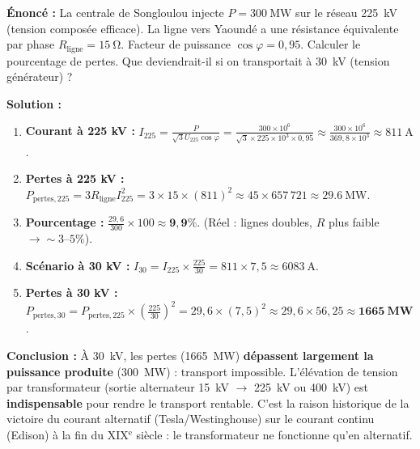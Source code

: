 \documentclass[11pt]{article}
\begin{document}
\begin{exoresolu}
\textbf{Énoncé :} La centrale de Songloulou injecte $P = \SI{300}{\mega\watt}$ sur le réseau \SI{225}{\kilo\volt} (tension composée efficace). La ligne vers Yaoundé a une résistance équivalente par phase $R_{\text{ligne}} = \SI{15}{\ohm}$. Facteur de puissance $\cos\varphi = 0,95$. Calculer le pourcentage de pertes. Que deviendrait-il si on transportait à \SI{30}{\kilo\volt} (tension générateur) ?

\tcblower

\textbf{Solution :}
\begin{enumerate}
    \item \textbf{Courant à 225 kV :} $I_{225} = \frac{P}{\sqrt{3} U_{225} \cos\varphi} = \frac{300 \times 10^6}{\sqrt{3} \times 225 \times 10^3 \times 0,95} \approx \frac{300 \times 10^6}{369,8 \times 10^3} \approx \SI{811}{\ampere}$.
    \item \textbf{Pertes à 225 kV :} $P_{\text{pertes},225} = 3 R_{\text{ligne}} I_{225}^2 = 3 \times 15 \times (811)^2 \approx 45 \times 657\,721 \approx \SI{29,6}{\mega\watt}$.
    \item \textbf{Pourcentage :} $\frac{29,6}{300} \times 100 \approx \mathbf{9,9\%}$. (Réel : lignes doubles, $R$ plus faible $\rightarrow \sim 3\text{--}5\%$).
    \item \textbf{Scénario à 30 kV :} $I_{30} = I_{225} \times \frac{225}{30} = 811 \times 7,5 \approx \SI{6083}{\ampere}$.
    \item \textbf{Pertes à 30 kV :} $P_{\text{pertes},30} = P_{\text{pertes},225} \times \left(\frac{225}{30}\right)^2 = 29,6 \times (7,5)^2 \approx 29,6 \times 56,25 \approx \mathbf{\SI{1665}{\mega\watt}}$.
\end{enumerate}
\textbf{Conclusion :} À \SI{30}{\kilo\volt}, les pertes (\SI{1665}{\mega\watt}) \textbf{dépassent largement la puissance produite} (\SI{300}{\mega\watt}) : transport impossible. L'élévation de tension par transformateur (sortie alternateur \SI{15}{\kilo\volt} $\rightarrow$ \SI{225}{\kilo\volt} ou \SI{400}{\kilo\volt}) est \textbf{indispensable} pour rendre le transport rentable. C'est la raison historique de la victoire du courant alternatif (Tesla/Westinghouse) sur le courant continu (Edison) à la fin du XIX$^{\text{e}}$ siècle : le transformateur ne fonctionne qu'en alternatif.
\end{exoresolu}
\end{document}
